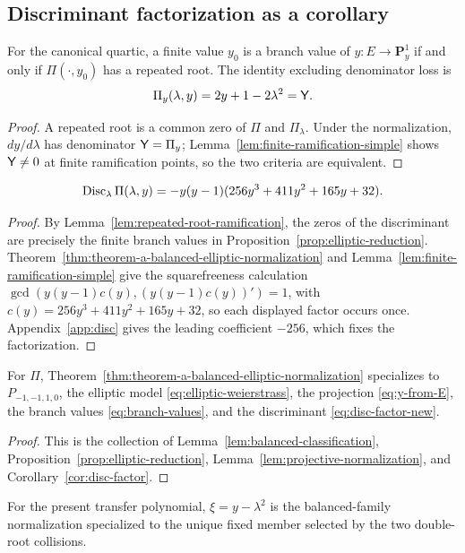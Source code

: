 \subsection{Discriminant factorization as a corollary}\label{subsec:disc-corollary}
\begin{lemma}\label{lem:repeated-root-ramification}
For the canonical quartic, a finite value $y_0$ is a branch value of $y:E\to\mathbf P^1_y$ if and only if $\Pi(\cdot,y_0)$ has a repeated root.  The identity excluding denominator loss is
\begin{equation}\label{eq:Pi-y-equals-Weierstrass-coordinate}
\Pi_y(\lambda,y)=2y+1-2\lambda^2=\mathsf{Y}.
\end{equation}
\end{lemma}
\begin{proof}
A repeated root is a common zero of $\Pi$ and $\Pi_\lambda$.  Under the normalization, $dy/d\lambda$ has denominator $\mathsf{Y}=\Pi_y$; Lemma~\ref{lem:finite-ramification-simple} shows $\mathsf{Y}\ne0$ at finite ramification points, so the two criteria are equivalent.
\end{proof}

\begin{corollary}\label{cor:disc-factor}
\begin{equation}\label{eq:disc-factor-new}
\operatorname{Disc}_\lambda\Pi(\lambda,y)=-y(y-1)(256y^3+411y^2+165y+32).
\end{equation}
\end{corollary}
\begin{proof}
By Lemma~\ref{lem:repeated-root-ramification}, the zeros of the discriminant are precisely the finite branch values in Proposition~\ref{prop:elliptic-reduction}.  Theorem~\ref{thm:theorem-a-balanced-elliptic-normalization} and Lemma~\ref{lem:finite-ramification-simple} give the squarefreeness calculation \(\gcd(y(y-1)c(y),(y(y-1)c(y))')=1\), with \(c(y)=256y^3+411y^2+165y+32\), so each displayed factor occurs once.  Appendix~\ref{app:disc} gives the leading coefficient $-256$, which fixes the factorization.
\end{proof}

\begin{corollary}\label{cor:canonical-theorem-a-specialization}
For $\Pi$, Theorem~\ref{thm:theorem-a-balanced-elliptic-normalization} specializes to $P_{-1,-1,1,0}$, the elliptic model \eqref{eq:elliptic-weierstrass}, the projection \eqref{eq:y-from-E}, the branch values \eqref{eq:branch-values}, and the discriminant \eqref{eq:disc-factor-new}.
\end{corollary}
\begin{proof}
This is the collection of Lemma~\ref{lem:balanced-classification}, Proposition~\ref{prop:elliptic-reduction}, Lemma~\ref{lem:projective-normalization}, and Corollary~\ref{cor:disc-factor}.
\end{proof}

\begin{remark}\label{rem:genus-one-upgrade}
For the present transfer polynomial, $\xi=y-\lambda^2$ is the balanced-family normalization specialized to the unique fixed member selected by the two double-root collisions.
\end{remark}
